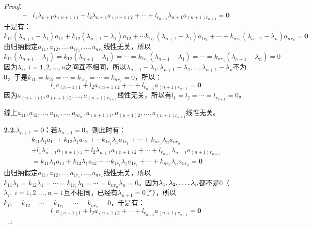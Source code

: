 \begin{proof}
\begin{align*}
		+&l_1\lambda_{n+1}a_{(n+1)1}+l_2\lambda_{n+1}a_{(n+1)2}+\cdots+l_{r_{n+1}}\lambda_{n+1}a_{(n+1)r_{n+1}}=\mathbf{0}
	\end{align*}
	于是有：
	\begin{equation*}
		k_{11}(\lambda_{n+1}-\lambda_1)a_{11}+k_{12}(\lambda_{n+1}-\lambda_1)a_{12}+\cdots k_{1r_1}(\lambda_{n+1}-\lambda_1)a_{1r_1}+\cdots+k_{nr_n}(\lambda_{n+1}-\lambda_n)a_{nr_n}=\mathbf{0}
	\end{equation*}
	由归纳假定$a_{11},a_{12},\dots,a_{1r_1},\dots,a_{nr_n}$线性无关，所以
	\begin{equation*}
		k_{11}(\lambda_{n+1}-\lambda_1)=k_{12}(\lambda_{n+1}-\lambda_1)=\cdots=k_{1r_1}(\lambda_{n+1}-\lambda_1)=\cdots=k_{nr_n}(\lambda_{n+1}-\lambda_n)=0
	\end{equation*}
	因为$\lambda_i,\;i=1,2,\dots,n$之间互不相同，所以$\lambda_{n+1}-\lambda_1,\lambda_{n+1}-\lambda_2,\dots,\lambda_{n+1}-\lambda_n$不为$0$，于是$k_{11}=k_{12}=\cdots=k_{1r_1}=\cdots=k_{nr_n}=0$，所以：
	\begin{equation*}
		l_1a_{(n+1)1}+l_2a_{(n+1)2}+\cdots+l_{r_{n+1}}a_{(n+1)r_{n+1}}=\mathbf{0}
	\end{equation*}
	因为$a_{(n+1)1},a_{(n+1)2},\dots,a_{(n+1)r_{n+1}}$线性无关，所以有$l_1=l_2=\cdots=l_{r_{n+1}}=0$。\par
	综上$a_{11},a_{12},\dots,a_{1r_1},\dots,a_{nr_n},a_{(n+1)1},a_{(n+1)2},\dots,a_{(n+1)r_{n+1}}$线性无关。\par
	\textbf{2.2.$\lambda_{n+1}=0$：}若$\lambda_{n+1}=0$，则此时有：
	\begin{gather*}
		k_{11}\lambda_1a_{11}+k_{12}\lambda_1a_{12}+\cdots k_{1r_1}\lambda_1a_{1r_1}+\cdots+k_{nr_n}\lambda_na_{nr_n} \\
		+l_1\lambda_{n+1}a_{(n+1)1}+l_2\lambda_{n+1}a_{(n+1)2}+\cdots+l_{r_{n+1}}\lambda_{n+1}a_{(n+1)r_{n+1}} \\
		=k_{11}\lambda_1a_{11}+k_{12}\lambda_1a_{12}+\cdots k_{1r_1}\lambda_1a_{1r_1}+\cdots+k_{nr_n}\lambda_na_{nr_n}=\mathbf{0}
	\end{gather*}
	由归纳假定$a_{11},a_{12},\dots,a_{1r_1},\dots,a_{nr_n}$线性无关，所以$k_{11}\lambda_1=k_{12}\lambda_1=\cdots=k_{1r_1}\lambda_1=\cdots=k_{nr_n}\lambda_n=0$。因为$\lambda_1, \lambda_2, \dots, \lambda_{n}$都不是$0$（$\lambda_i,\;i=1,2,\dots,n+1$互不相同，已经有$\lambda_{n+1}=0$了），所以$k_{11}=k_{12}=\cdots=k_{1r_1}=\cdots=k_{nr_n}=0$，于是有：
	\begin{equation*}
		l_1a_{(n+1)1}+l_2a_{(n+1)2}+\cdots+l_{r_{n+1}}a_{(n+1)r_{n+1}}=\mathbf{0}
	\end{equation*}

\end{proof}
